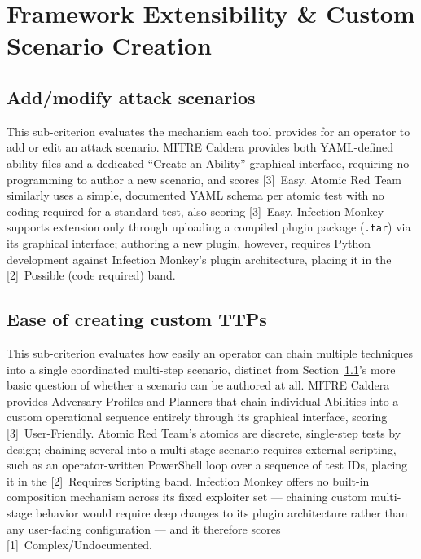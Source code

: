 \section{Framework Extensibility \& Custom Scenario Creation}\label{sec:Matrix5}

\subsection{Add/modify attack scenarios}\label{sec:Matrix5_5_1}

This sub-criterion evaluates the mechanism each tool provides for an operator to add or edit an attack scenario. MITRE Caldera provides both YAML-defined ability files and a dedicated ``Create an Ability'' graphical interface, requiring no programming to author a new scenario, and scores [3]~Easy. Atomic Red Team similarly uses a simple, documented YAML schema per atomic test with no coding required for a standard test, also scoring [3]~Easy. Infection Monkey supports extension only through uploading a compiled plugin package (\texttt{.tar}) via its graphical interface; authoring a new plugin, however, requires Python development against Infection Monkey's plugin architecture, placing it in the [2]~Possible (code required) band.

\subsection{Ease of creating custom TTPs}\label{sec:Matrix5_5_2}

This sub-criterion evaluates how easily an operator can chain multiple techniques into a single coordinated multi-step scenario, distinct from Section~\ref{sec:Matrix5_5_1}'s more basic question of whether a scenario can be authored at all. MITRE Caldera provides Adversary Profiles and Planners that chain individual Abilities into a custom operational sequence entirely through its graphical interface, scoring [3]~User-Friendly. Atomic Red Team's atomics are discrete, single-step tests by design; chaining several into a multi-stage scenario requires external scripting, such as an operator-written PowerShell loop over a sequence of test IDs, placing it in the [2]~Requires Scripting band. Infection Monkey offers no built-in composition mechanism across its fixed exploiter set --- chaining custom multi-stage behavior would require deep changes to its plugin architecture rather than any user-facing configuration --- and it therefore scores [1]~Complex/Undocumented.

